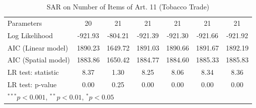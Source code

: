 \begin{table}[!h]
\begin{center}
\begin{tabular}{l c c c c c c }
Parameters              & 20           & 21           & 21           & 21           & 21           & 21           \\
Log Likelihood          & -921.93      & -804.21      & -921.39      & -921.30      & -921.66      & -921.92      \\
AIC (Linear model)      & 1890.23      & 1649.72      & 1891.03      & 1890.66      & 1891.67      & 1892.19      \\
AIC (Spatial model)     & 1883.86      & 1650.42      & 1884.77      & 1884.60      & 1885.33      & 1885.83      \\
LR test: statistic      & 8.37         & 1.30         & 8.25         & 8.06         & 8.34         & 8.36         \\
LR test: p-value        & 0.00         & 0.25         & 0.00         & 0.00         & 0.00         & 0.00         \\
\bottomrule
\multicolumn{7}{l}{\scriptsize{$^{***}p<0.001$, $^{**}p<0.01$, $^*p<0.05$}}
\end{tabular}
\caption{SAR on Number of Items of Art. 11 (Tobacco Trade)}
\label{table:coefficients}
\end{center}
\end{table}

